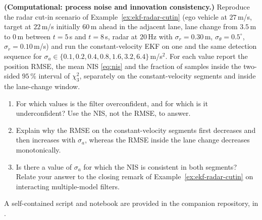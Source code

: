 \begin{prob}\label{prob:ch03:10}
\textbf{(Computational: process noise and innovation consistency.)} Reproduce the radar cut-in scenario of Example~\ref{ex:ekf-radar-cutin} (ego vehicle at $27$\,m/s, target at $22$\,m/s initially $60$\,m ahead in the adjacent lane, lane change from $3.5$\,m to $0$\,m between $t=5$\,s and $t=8$\,s, radar at $20$\,Hz with $\sigma_r=0.30$\,m, $\sigma_\theta=0.5^{\circ}$, $\sigma_{\dot r}=0.10$\,m/s) and run the constant-velocity EKF on one and the same detection sequence for $\sigma_a\in\{0.1,0.2,0.4,0.8,1.6,3.2,6.4\}$\,m/s$^{2}$. For each value report the position RMSE, the mean NIS \eqref{eq:nis} and the fraction of samples inside the two-sided $95\,\%$ interval of $\chi^{2}_{3}$, separately on the constant-velocity segments and inside the lane-change window.
\begin{enumerate}
\item[(a)] For which values is the filter overconfident, and for which is it underconfident? Use the NIS, not the RMSE, to answer.
\item[(b)] Explain why the RMSE on the constant-velocity segments first decreases and then increases with $\sigma_a$, whereas the RMSE inside the lane change decreases monotonically.
\item[(c)] Is there a value of $\sigma_a$ for which the NIS is consistent in both segments? Relate your answer to the closing remark of Example~\ref{ex:ekf-radar-cutin} on interacting multiple-model filters.
\end{enumerate}
A self-contained script and notebook are provided in the companion repository, in .
\end{prob}

